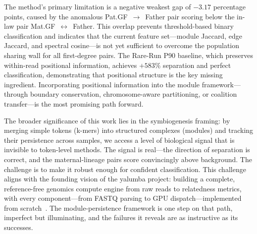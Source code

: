 \documentclass{../yalumba}
\begin{document}
The method's primary limitation is a negative weakest gap of $-3.17$
percentage points, caused by the anomalous Pat.GF~$\to$~Father pair scoring
below the in-law pair Mat.GF~$\leftrightarrow$~Father.  This overlap prevents
threshold-based binary classification and indicates that the current feature
set---module Jaccard, edge Jaccard, and spectral cosine---is not yet
sufficient to overcome the population sharing wall for all first-degree pairs.
The Rare-Run P90 baseline, which preserves within-read positional information,
achieves $+583\%$ separation and perfect classification, demonstrating that
positional structure is the key missing ingredient.  Incorporating positional
information into the module framework---through boundary conservation,
chromosome-aware partitioning, or coalition transfer---is the most promising
path forward.

The broader significance of this work lies in the symbiogenesis framing:
by merging simple tokens (k-mers) into structured complexes (modules) and
tracking their persistence across samples, we access a level of biological
signal that is invisible to token-level methods.  The signal is real---the
direction of separation is correct, and the maternal-lineage pairs score
convincingly above background.  The challenge is to make it robust enough
for confident classification.  This challenge aligns with the founding vision
of the yalumba project: building a complete, reference-free genomics compute
engine from raw reads to relatedness metrics, with every
component---from FASTQ parsing to GPU dispatch---implemented from
scratch~\cite{margulis1998}.  The module-persistence framework is one step
on that path, imperfect but illuminating, and the failures it reveals are as
instructive as its successes.



\end{document}
